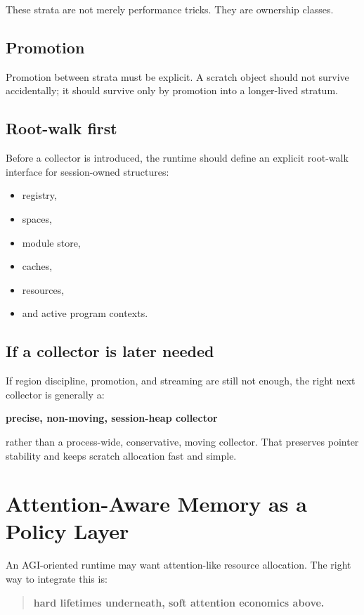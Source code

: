 \documentclass[11pt]{article}
\begin{document}
These strata are not merely performance tricks. They are ownership classes.

\subsection{Promotion}

Promotion between strata must be explicit. A scratch object should not survive accidentally; it should survive only by promotion into a longer-lived stratum.

\subsection{Root-walk first}

Before a collector is introduced, the runtime should define an explicit root-walk interface for session-owned structures:
\begin{itemize}[leftmargin=2em]
  \item registry,
  \item spaces,
  \item module store,
  \item caches,
  \item resources,
  \item and active program contexts.
\end{itemize}

\subsection{If a collector is later needed}

If region discipline, promotion, and streaming are still not enough, the right next collector is generally a:
\begin{center}
\textbf{precise, non-moving, session-heap collector}
\end{center}

rather than a process-wide, conservative, moving collector. That preserves pointer stability and keeps scratch allocation fast and simple.

\section{Attention-Aware Memory as a Policy Layer}

An AGI-oriented runtime may want attention-like resource allocation. The right way to integrate this is:
\begin{quote}
\textbf{hard lifetimes underneath, soft attention economics above.}
\end{quote}
\end{document}
